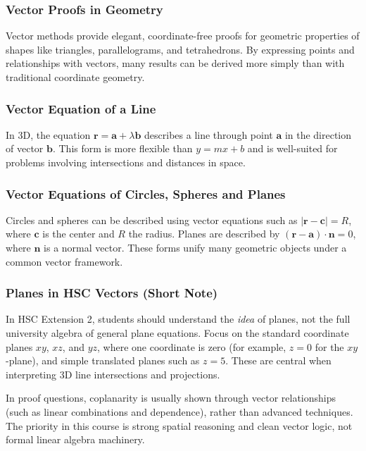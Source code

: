 \documentclass[12pt]{article}
\begin{document}
\subsubsection{Vector Proofs in Geometry}
Vector methods provide elegant, coordinate-free proofs for geometric properties of shapes like triangles, parallelograms, and tetrahedrons. By expressing points and relationships with vectors, many results can be derived more simply than with traditional coordinate geometry.

\subsubsection{Vector Equation of a Line}
In 3D, the equation $\mathbf{r} = \mathbf{a} + \lambda\mathbf{b}$ describes a line through point $\mathbf{a}$ in the direction of vector $\mathbf{b}$. This form is more flexible than $y=mx+b$ and is well-suited for problems involving intersections and distances in space.

\subsubsection{Vector Equations of Circles, Spheres and Planes}
Circles and spheres can be described using vector equations such as $|\mathbf{r} - \mathbf{c}| = R$, where $\mathbf{c}$ is the center and $R$ the radius. Planes are described by $ (\mathbf{r} - \mathbf{a}) \cdot \mathbf{n} = 0 $, where $\mathbf{n}$ is a normal vector. These forms unify many geometric objects under a common vector framework.

\subsubsection{Planes in HSC Vectors (Short Note)}
\label{sec:planes-hsc-note}
In HSC Extension 2, students should understand the \textit{idea} of planes, not the full university algebra of general plane equations. Focus on the standard coordinate planes $xy$, $xz$, and $yz$, where one coordinate is zero (for example, $z=0$ for the $xy$-plane), and simple translated planes such as $z=5$. These are central when interpreting 3D line intersections and projections.

In proof questions, coplanarity is usually shown through vector relationships (such as linear combinations and dependence), rather than advanced techniques. The priority in this course is strong spatial reasoning and clean vector logic, not formal linear algebra machinery.
\end{document}
